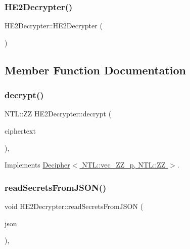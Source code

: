 \subsubsection{\texorpdfstring{H\+E2\+Decrypter()}{HE2Decrypter()}}
{\footnotesize\ttfamily H\+E2\+Decrypter\+::\+H\+E2\+Decrypter (\begin{DoxyParamCaption}{ }\end{DoxyParamCaption})}



\subsection{Member Function Documentation}
\mbox{\label{classHE2Decrypter_a766f96cb2277fd3e4af59ca44a32d519}} 
\subsubsection{\texorpdfstring{decrypt()}{decrypt()}}
{\footnotesize\ttfamily N\+T\+L\+::\+ZZ H\+E2\+Decrypter\+::decrypt (\begin{DoxyParamCaption}\item[{N\+T\+L\+::vec\+\_\+\+Z\+Z\+\_\+p \&}]{ciphertext }\end{DoxyParamCaption})\hspace{0.3cm}{\ttfamily [override]}, {\ttfamily [virtual]}}



Implements \hyperlink{classDecipher_ac6b8c369eda2d7e17fa90cb594cf41b6}{Decipher$<$ N\+T\+L\+::vec\+\_\+\+Z\+Z\+\_\+p, N\+T\+L\+::\+Z\+Z $>$}.

\mbox{\label{classHE2Decrypter_a9cf1a6eae2667f6e891237589c4eeda0}} 
\subsubsection{\texorpdfstring{read\+Secrets\+From\+J\+S\+O\+N()}{readSecretsFromJSON()}}
{\footnotesize\ttfamily void H\+E2\+Decrypter\+::read\+Secrets\+From\+J\+S\+ON (\begin{DoxyParamCaption}\item[{std\+::string \&}]{json }\end{DoxyParamCaption})\hspace{0.3cm}{\ttfamily [override]}, {\ttfamily [virtual]}}



